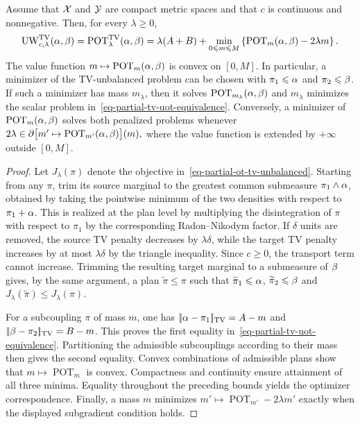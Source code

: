 \begin{prop}\label{prop-tv-partial-ot-lagrange}
Assume that $\mathcal{X}$ and $\mathcal{Y}$ are compact metric spaces and that $c$ is continuous and nonnegative. Then, for every $\lambda\geq0$,
\begin{equation}\label{eq-partial-tv-uot-equivalence}
\operatorname{UW}_{c,\lambda}^{\operatorname{TV}}(\alpha,\beta)
=
\operatorname{POT}^{\operatorname{TV}}_\lambda(\alpha,\beta)
=
\lambda(A+B)
+
\min_{0\leqslant m\leqslant M}
\left\{
\operatorname{POT}_m(\alpha,\beta)-2\lambda m
\right\}.
\end{equation}
The value function $m\mapsto\operatorname{POT}_m(\alpha,\beta)$ is convex on $[0,M]$. In particular, a minimizer of the TV-unbalanced problem can be chosen with $\pi_1\leqslant\alpha$ and $\pi_2\leqslant\beta$. If such a minimizer has mass $m_\lambda$, then it solves $\operatorname{POT}_{m_\lambda}(\alpha,\beta)$ and $m_\lambda$ minimizes the scalar problem in~\eqref{eq-partial-tv-uot-equivalence}. Conversely, a minimizer of $\operatorname{POT}_m(\alpha,\beta)$ solves both penalized problems whenever
\(2\lambda\in\partial\bigl[m'\mapsto\operatorname{POT}_{m'}(\alpha,\beta)\bigr](m),\)
where the value function is extended by $+\infty$ outside $[0,M]$.
\end{prop}
\begin{proof}
Let $J_\lambda(\pi)$ denote the objective in~\eqref{eq-partial-ot-tv-unbalanced}. Starting from any $\pi$, trim its source marginal to the greatest common submeasure $\pi_1\wedge\alpha$, obtained by taking the pointwise minimum of the two densities with respect to $\pi_1+\alpha$. This is realized at the plan level by multiplying the disintegration of $\pi$ with respect to $\pi_1$ by the corresponding Radon--Nikodym factor. If $\delta$ units are removed, the source TV penalty decreases by $\lambda\delta$, while the target TV penalty increases by at most $\lambda\delta$ by the triangle inequality. Since $c\geq0$, the transport term cannot increase. Trimming the resulting target marginal to a submeasure of $\beta$ gives, by the same argument, a plan $\widetilde\pi\leq\pi$ such that $\widetilde\pi_1\leqslant\alpha$, $\widetilde\pi_2\leqslant\beta$ and $J_\lambda(\widetilde\pi)\leq J_\lambda(\pi)$.

For a subcoupling $\pi$ of mass $m$, one has
\(|\!| \alpha-\pi_1 |\!|_{\operatorname{TV}}=A-m\) and \(|\!| \beta-\pi_2 |\!|_{\operatorname{TV}}=B-m\).
This proves the first equality in~\eqref{eq-partial-tv-uot-equivalence}. Partitioning the admissible subcouplings according to their mass then gives the second equality. Convex combinations of admissible plans show that $m\mapsto\operatorname{POT}_m$ is convex. Compactness and continuity ensure attainment of all three minima. Equality throughout the preceding bounds yields the optimizer correspondence. Finally, a mass $m$ minimizes $m'\mapsto\operatorname{POT}_{m'}-2\lambda m'$ exactly when the displayed subgradient condition holds.
\end{proof}
